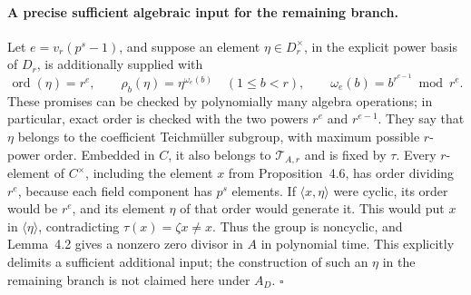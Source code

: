 \paragraph{A precise sufficient algebraic input for the remaining branch.}
Let \(e=v_r(p^s-1)\), and suppose an element
\(\eta\in D_r^\times\), in the explicit power basis of \(D_r\),
is additionally supplied with
\[
 \operatorname{ord}(\eta)=r^e,\qquad
 \rho_b(\eta)=\eta^{\omega_e(b)}
 \quad(1\leq b<r),
 \qquad
 \omega_e(b)=b^{r^{e-1}}\bmod r^e.
\]
These promises can be checked by polynomially many algebra
operations; in particular, exact order is checked with the two
powers \(r^e\) and \(r^{e-1}\).
They say that \(\eta\) belongs to the coefficient
Teichm\"uller subgroup, with maximum possible \(r\)-power order.
Embedded in \(C\), it also belongs to \(\mathcal T_{A,r}\)
and is fixed by \(\tau\).
Every \(r\)-element of \(C^\times\), including the element \(x\)
from Proposition~4.6, has order dividing \(r^e\), because each
field component has \(p^s\) elements.
If \(\langle x,\eta\rangle\) were cyclic, its order would be
\(r^e\), and its element \(\eta\) of that order would generate
it. This would put \(x\) in \(\langle\eta\rangle\), contradicting
\(\tau(x)=\zeta x\ne x\).
Thus the group is noncyclic, and Lemma~4.2 gives a nonzero zero
divisor in \(A\) in polynomial time.
This explicitly delimits a sufficient additional input; the
construction of such an \(\eta\) in the remaining branch is not
claimed here under \(A_D\).
\hfill\(\square\)

